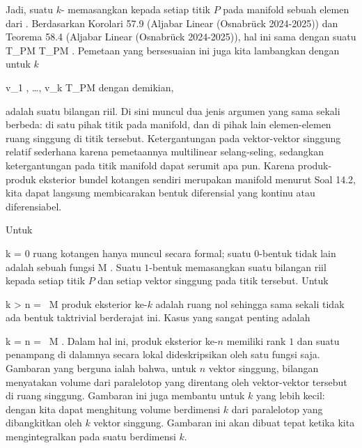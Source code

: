 {}
{

Jadi, suatu $k$-
memasangkan kepada setiap titik $P$ pada manifold sebuah elemen dari
. Berdasarkan
Korolari 57.9 (Aljabar Linear (Osnabrück 2024-2025))
dan Teorema 58.4 (Aljabar Linear (Osnabrück 2024-2025)),
hal ini sama dengan suatu
\maabbdisp {} {T_PM \times \cdots \times T_PM } { \R
} {.}
Pemetaan yang bersesuaian ini juga kita lambangkan dengan
 untuk $k$

\mavergleichskette
{\vergleichskette
{ v_1 , \ldots , v_k
}
{ \in }{ T_PM
}
{  }{
}
{    }{
}
{   }{
}
}
{}{}{}
dengan demikian,

 {  }

adalah suatu bilangan riil. Di sini muncul dua jenis argumen yang sama sekali berbeda: di satu pihak titik pada manifold, dan di pihak lain elemen-elemen ruang singgung di titik tersebut. Ketergantungan pada vektor-vektor singgung relatif sederhana karena pemetaannya multilinear selang-seling, sedangkan ketergantungan pada titik manifold dapat serumit apa pun. Karena produk-produk eksterior bundel kotangen sendiri merupakan manifold menurut
Soal 14.2,
kita dapat langsung membicarakan bentuk diferensial yang kontinu atau
 {} {}
diferensiabel.

Untuk

\mavergleichskette
{\vergleichskette
{ k
}
{ = }{ 0
}
{  }{
}
{    }{
}
{   }{
}
}
{}{}{}
ruang kotangen hanya muncul secara formal; suatu $0$-bentuk tidak lain adalah sebuah fungsi
 { M } {\R
} {.}
Suatu $1$-bentuk
 {} {}
memasangkan suatu bilangan riil kepada setiap titik $P$ dan setiap vektor singgung pada titik tersebut. Untuk

\mavergleichskette
{\vergleichskette
{k
}
{ > }{ n
}
{ = }{  \, M
}
{    }{
}
{   }{
}
}
{}{}{}
produk eksterior ke-$k$ adalah ruang nol sehingga sama sekali tidak ada bentuk taktrivial berderajat ini. Kasus yang sangat penting adalah

\mavergleichskette
{\vergleichskette
{ k
}
{ = }{ n
}
{ = }{  \, M
}
{    }{
}
{   }{
}
}
{}{}{.}
Dalam hal ini, produk eksterior ke-$n$ memiliki rank $1$
 {} {}
dan suatu penampang di dalamnya secara lokal dideskripsikan oleh satu fungsi saja. Gambaran yang berguna ialah bahwa, untuk $n$ vektor singgung, bilangan
 menyatakan volume
 {} {}
dari paralelotop yang direntang oleh vektor-vektor tersebut di ruang singgung. Gambaran ini juga membantu untuk $k$ yang lebih kecil: dengan
 kita dapat menghitung volume berdimensi $k$ dari paralelotop yang dibangkitkan oleh $k$ vektor singgung. Gambaran ini akan dibuat tepat ketika kita mengintegralkan pada suatu
berdimensi $k$.

}
